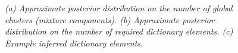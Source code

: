 \documentclass[journal]{IEEEtran}
\begin{document}
\begin{figure}[!htbp]
{ }
 \hspace{-3mm}
  \caption{\small \emph{(a) Approximate posterior distribution on the number of global clusters
(mixture components). (b) Approximate posterior distribution on the
number of required dictionary elements. (c) Example inferred
dictionary elements.}}
\end{figure}
\end{document}
